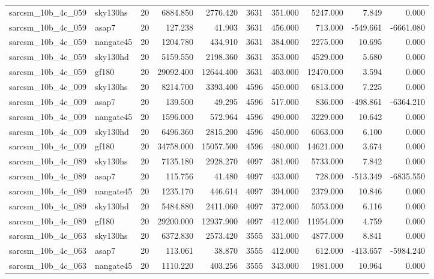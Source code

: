 \documentclass{article}
\begin{document}
\begin{longtable}{llrrrrrrrr}
sarcsm\_10b\_4c\_059 & sky130hs & 20 & 6884.850 & 2776.420 & 3631 & 351.000 & 5247.000 & 7.849 & 0.000 \\
sarcsm\_10b\_4c\_059 & asap7 & 20 & 127.238 & 41.903 & 3631 & 456.000 & 713.000 & -549.661 & -6661.080 \\
sarcsm\_10b\_4c\_059 & nangate45 & 20 & 1204.780 & 434.910 & 3631 & 384.000 & 2275.000 & 10.695 & 0.000 \\
sarcsm\_10b\_4c\_059 & sky130hd & 20 & 5159.550 & 2198.360 & 3631 & 353.000 & 4529.000 & 5.680 & 0.000 \\
sarcsm\_10b\_4c\_059 & gf180 & 20 & 29092.400 & 12644.400 & 3631 & 403.000 & 12470.000 & 3.594 & 0.000 \\
sarcsm\_10b\_4c\_009 & sky130hs & 20 & 8214.700 & 3393.400 & 4596 & 450.000 & 6813.000 & 7.225 & 0.000 \\
sarcsm\_10b\_4c\_009 & asap7 & 20 & 139.500 & 49.295 & 4596 & 517.000 & 836.000 & -498.861 & -6364.210 \\
sarcsm\_10b\_4c\_009 & nangate45 & 20 & 1596.000 & 572.964 & 4596 & 490.000 & 3229.000 & 10.642 & 0.000 \\
sarcsm\_10b\_4c\_009 & sky130hd & 20 & 6496.360 & 2815.200 & 4596 & 450.000 & 6063.000 & 6.100 & 0.000 \\
sarcsm\_10b\_4c\_009 & gf180 & 20 & 34758.000 & 15057.500 & 4596 & 480.000 & 14621.000 & 3.674 & 0.000 \\
sarcsm\_10b\_4c\_089 & sky130hs & 20 & 7135.180 & 2928.270 & 4097 & 381.000 & 5733.000 & 7.842 & 0.000 \\
sarcsm\_10b\_4c\_089 & asap7 & 20 & 115.756 & 41.480 & 4097 & 433.000 & 728.000 & -513.349 & -6835.550 \\
sarcsm\_10b\_4c\_089 & nangate45 & 20 & 1235.170 & 446.614 & 4097 & 394.000 & 2379.000 & 10.846 & 0.000 \\
sarcsm\_10b\_4c\_089 & sky130hd & 20 & 5484.880 & 2411.060 & 4097 & 372.000 & 5053.000 & 6.116 & 0.000 \\
sarcsm\_10b\_4c\_089 & gf180 & 20 & 29200.000 & 12937.900 & 4097 & 412.000 & 11954.000 & 4.759 & 0.000 \\
sarcsm\_10b\_4c\_063 & sky130hs & 20 & 6372.830 & 2573.420 & 3555 & 331.000 & 4877.000 & 8.841 & 0.000 \\
sarcsm\_10b\_4c\_063 & asap7 & 20 & 113.061 & 38.870 & 3555 & 412.000 & 612.000 & -413.657 & -5984.240 \\
sarcsm\_10b\_4c\_063 & nangate45 & 20 & 1110.220 & 403.256 & 3555 & 343.000 & 1981.000 & 10.964 & 0.000 \\

\end{longtable}
\end{document}
